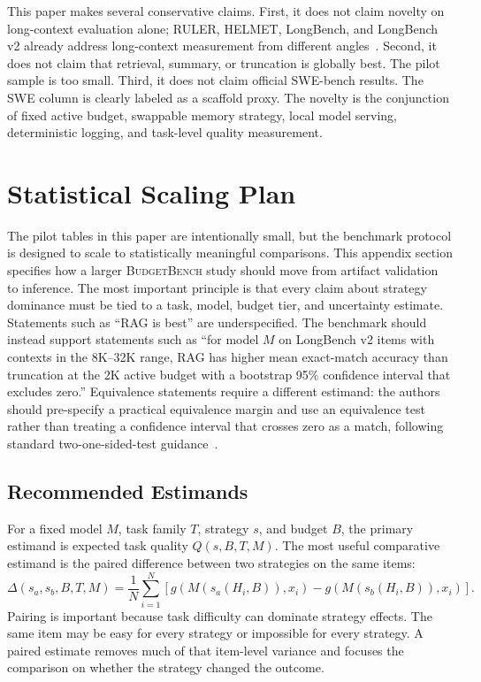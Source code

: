 \documentclass[11pt]{article}
\newcommand{\BudgetBench}{\textsc{BudgetBench}}
\begin{document}
This paper makes several conservative claims.  First, it does not claim
novelty on long-context evaluation alone; RULER, HELMET, LongBench,
and LongBench v2 already address long-context measurement from different
angles~\citep{bai2023longbench,bai2024longbenchv2,hsieh2024ruler,yen2024helmet}.
Second, it does not claim that retrieval, summary, or truncation is globally
best.  The pilot sample is too small.  Third, it does not claim official
SWE-bench results.  The SWE column is clearly labeled as a scaffold proxy.
The novelty is the conjunction of fixed active budget, swappable memory
strategy, local model serving, deterministic logging, and task-level quality
measurement.

\section{Statistical Scaling Plan}

The pilot tables in this paper are intentionally small, but the benchmark
protocol is designed to scale to statistically meaningful comparisons.  This
appendix section specifies how a larger \BudgetBench{} study should move from
artifact validation to inference.  The most important principle is that every
claim about strategy dominance must be tied to a task, model, budget tier, and
uncertainty estimate.  Statements such as ``RAG is best'' are underspecified.
The benchmark should instead support statements such as ``for model $M$ on
LongBench v2 items with contexts in the 8K--32K range, RAG has higher mean
exact-match accuracy than truncation at the 2K active budget with a bootstrap
95\% confidence interval that excludes zero.''
Equivalence statements require a different estimand: the authors should
pre-specify a practical equivalence margin and use an equivalence test rather
than treating a confidence interval that crosses zero as a match, following
standard two-one-sided-test guidance~\citep{lakens2017equivalence}.

\subsection{Recommended Estimands}

For a fixed model $M$, task family $T$, strategy $s$, and budget $B$, the
primary estimand is expected task quality $Q(s, B, T, M)$.  The most useful
comparative estimand is the paired difference between two strategies on the
same items:
\[
  \Delta(s_a, s_b, B, T, M) =
  \frac{1}{N}\sum_{i=1}^{N}
  \left[g(M(s_a(H_i, B)), x_i) - g(M(s_b(H_i, B)), x_i)\right].
\]
Pairing is important because task difficulty can dominate strategy effects.
The same item may be easy for every strategy or impossible for every strategy.
A paired estimate removes much of that item-level variance and focuses the
comparison on whether the strategy changed the outcome.
\end{document}
